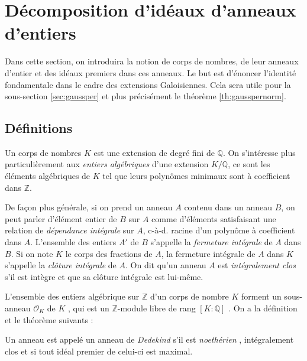 \documentclass[a4paper]{article} %
\numberwithin{section}{part}
\numberwithin{equation}{section}
\newcommand\QQ{\mathbb{Q}}
\newcommand\ZZ{\mathbb{Z}}
\newcommand\EO{\mathcal{O}}
\begin{document}
\section{Décomposition d'idéaux d'anneaux d'entiers}
Dans cette section, on introduira la notion de corps de nombres, de leur
anneaux d'entier et des idéaux premiers dans ces anneaux. Le but est d'énoncer 
l'identité fondamentale dans le cadre des extensions Galoisiennes. Cela sera 
utile pour la sous-section \ref{sec:gaussper} et plus précisément le 
théorème \ref{th:gausspernorm}.

\subsection{Définitions}
Un corps de nombres $K$ est une extension de degré fini de $\QQ$. On s'intéresse
plus particulièrement aux \emph{entiers algébriques} d'une extension $K/\QQ$, ce
sont les éléments algébriques de $K$ tel que leurs polynômes minimaux sont à
coefficient dans $\ZZ$.\par 
De façon plus générale, si on prend un anneau $A$ contenu dans un anneau $B$, on
peut parler d'élément entier de $B$ sur $A$ comme d'éléments satisfaisant une 
relation de \emph{dépendance intégrale} sur $A$, c-à-d. racine d'un 
polynôme à coefficient dans $A$. L'ensemble des entiers $A'$ de $B$ s'appelle la
\emph{fermeture intégrale} de $A$ dans $B$. Si on note $K$ le corps des 
fractions de $A$, la fermeture intégrale de $A$ dans $K$ s'appelle la 
\emph{clôture intégrale} de $A$. On dit qu'un anneau $A$ est \emph{intégralement
clos} s'il est intègre et que sa clôture intégrale est lui-même.\par
L'ensemble des entiers algébrique sur $\ZZ$ d'un corps de nombre $K$ forment un
sous-anneau $\EO_K$ de $K$ \cite[p.~35, cor. 2]{Sam}, qui est un $\ZZ$-module 
libre de rang $[K:\QQ]$ \cite[p.~48, cor.]{Sam}. On a la définition et le 
théorème suivants :
\begin{defn}
Un anneau est appelé un anneau de \emph{Dedekind} s'il est \emph{noethérien} 
\cite[p.~55, déf. 1]{Sam}, intégralement clos et si tout idéal premier 
de celui-ci est maximal.
\end{defn}
\end{document}
